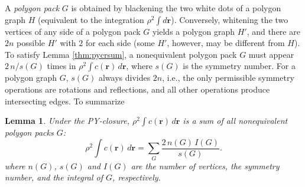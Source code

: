\documentclass[notitlepage,preprint]{revtex4-1}
\newtheorem{lemm}[thrm]{Lemma}
\newcommand{\vct}[1]{\mathbf{#1}}
\providecommand{\vr}{} %
\renewcommand{\vr}{\vct{r}}
\begin{document}
A \emph{polygon pack} $G$ is obtained
  by blackening the two white dots of a polygon graph $H$
  (equivalent to the integration $\rho^2 \int d\vr$).
%
Conversely,
  whitening the two vertices of any side of
  a polygon pack $G$
  yields a polygon graph $H'$,
  and there are $2n$ possible $H'$ with $2$ for each side
%
  (some $H'$, however, may be different from $H$).
%
To satisfy Lemma \ref{thm:pycrsum},
  a nonequivalent polygon pack $G$ must appear $2 \, n/s(G)$ times
  in $\rho^2 \int c(\vr) \, d\vr$,
  where $s(G)$ is the symmetry number.
%
For a polygon graph $G$, $s(G)$ always divides $2n$,
  i.e.,
  the only permissible symmetry operations
  are rotations and reflections,
  and all other operations produce intersecting edges.
%
To summarize
%
%
%
\begin{lemm}
Under the PY-closure,
  $\rho^2 \int c(\vr) \, d\vr$ is a sum of
  all nonequivalent polygon packs $G$:
  \begin{equation}
      \rho^2 \int c(\vr) \, d\vr
    = \sum_{G} \frac{ 2 \, n(G) \, I(G) }{ s(G) }.
  \label{eq:pykappasum}
  \end{equation}
  where $n(G)$, $s(G)$ and $I(G)$ are
  the number of vertices,
  the symmetry number,
  and the integral of $G$,
  respectively.
  \label{thm:pykappasum}
\end{lemm}
\end{document}
